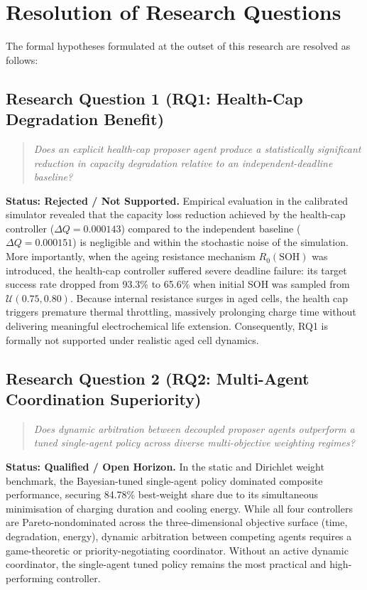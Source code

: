 
\section{Resolution of Research Questions}

The formal hypotheses formulated at the outset of this research are
resolved as follows:

\subsection*{Research Question 1 (RQ1: Health-Cap Degradation Benefit)}
\begin{quote}
  \emph{Does an explicit health-cap proposer agent produce a statistically
  significant reduction in capacity degradation relative to an independent-deadline
  baseline?}
\end{quote}
\textbf{Status: Rejected / Not Supported.}
Empirical evaluation in the calibrated simulator revealed that the capacity
loss reduction achieved by the health-cap controller ($\Delta Q = 0.000143$)
compared to the independent baseline ($\Delta Q = 0.000151$) is negligible
and within the stochastic noise of the simulation. More importantly, when
the ageing resistance mechanism $R_0(\mathrm{SOH})$ was introduced, the
health-cap controller suffered severe deadline failure: its target success
rate dropped from 93.3\% to 65.6\% when initial SOH was sampled from
$\mathcal{U}(0.75, 0.80)$. Because internal resistance surges in aged cells,
the health cap triggers premature thermal throttling, massively prolonging
charge time without delivering meaningful electrochemical life extension.
Consequently, RQ1 is formally not supported under realistic aged cell dynamics.

\subsection*{Research Question 2 (RQ2: Multi-Agent Coordination Superiority)}
\begin{quote}
  \emph{Does dynamic arbitration between decoupled proposer agents outperform
  a tuned single-agent policy across diverse multi-objective weighting regimes?}
\end{quote}
\textbf{Status: Qualified / Open Horizon.}
In the static and Dirichlet weight benchmark, the Bayesian-tuned single-agent
policy dominated composite performance, securing 84.78\% best-weight share
due to its simultaneous minimisation of charging duration and cooling energy.
While all four controllers are Pareto-nondominated across the three-dimensional
objective surface (time, degradation, energy), dynamic arbitration between
competing agents requires a game-theoretic or priority-negotiating coordinator.
Without an active dynamic coordinator, the single-agent tuned policy remains
the most practical and high-performing controller.

